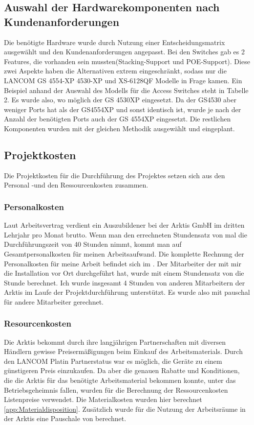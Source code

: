 \subsection{Auswahl der Hardwarekomponenten nach Kundenanforderungen}
\label{app:Auswahl der Hardwarekomponenten nach Kundenanforderungen}
Die benötigte Hardware wurde durch Nutzung einer Entscheidungsmatrix ausgewählt und den Kundenanforderungen angepasst. Bei den Switches gab es 2 Features, die vorhanden sein mussten(Stacking-Support und \ac{POE}-Support). Diese zwei Aspekte haben die Alternativen extrem eingeschränkt, sodass nur die LANCOM GS 4554-XP 4530-XP und XS-6128QF Modelle in Frage kamen.  Ein Beispiel anhand der Auswahl des Modells für die Access Switches steht in Tabelle 2. Es wurde also, wo möglich der GS 4530XP eingesetzt. Da der GS4530 aber weniger Ports hat als der GS4554XP und sonst identisch ist, wurde je nach der Anzahl der benötigten Ports auch der GS 4554XP eingesetzt. Die restlichen Komponenten wurden mit der gleichen Methodik ausgewählt und eingeplant.
\\

\subsection{Projektkosten}
\label{sec:Projektkosten}
Die Projektkosten für die Durchführung des Projektes setzen sich aus den Personal -und den Ressourcenkosten zusammen.
\subsubsection{Personalkosten}
Laut Arbeitsvertrag verdient ein Auszubildener bei der Arktis GmbH im dritten Lehrjahr pro Monat  brutto. 
Wenn man den errechneten Stundensatz von  mal die Durchführungszeit von 40 Stunden nimmt, kommt man auf  Gesamtpersonalkosten für meinen Arbeitsaufwand. Die komplette Rechnung der Personalkosten für meine Arbeit befindet sich im . 
Der Mitarbeiter der mit mir die Installation vor Ort durchgeführt hat, wurde mit einem Stundensatz von  die Stunde berechnet. Ich wurde insgesamt 4 Stunden von anderen Mitarbeitern der \ac{Arktis} im Laufe der Projektdurchführung unterstützt. Es wurde also mit  pauschal für andere Mitarbeiter gerechnet.

\subsubsection{Resourcenkosten}
Die \ac{Arktis} bekommt durch ihre langjährigen Partnerschaften mit diversen Händlern gewisse Preisermäßigungen beim Einkauf des Arbeitsmaterials. Durch den LANCOM Platin Partnerstatus war es möglich, die Geräte zu einem günstigeren Preis einzukaufen. Da aber die genauen Rabatte und Konditionen, die die \ac{Arktis} für das benötigte Arbeitsmaterial bekommen konnte, unter das Betriebsgeheimnis fallen, wurden für die Berechnung der Ressourcenkosten Listenpreise verwendet. Die Materialkosten wurden hier berechnet \ref{app:Materialdisposition}. Zusätzlich wurde für die Nutzung der Arbeitsräume in der \ac{Arktis} eine Pauschale von  berechnet.

